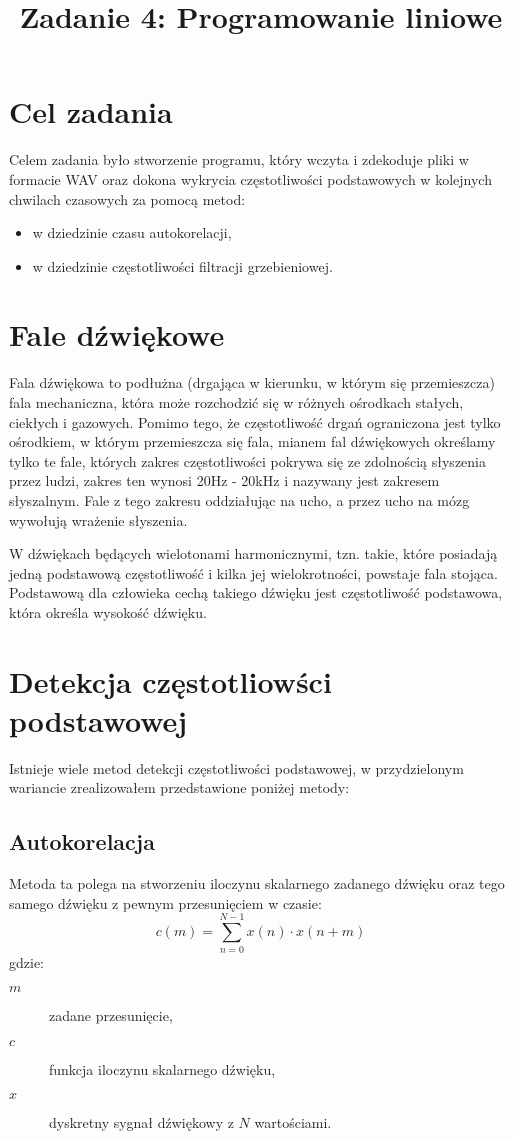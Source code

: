 \documentclass{classrep}
\author{%
  \studentinfo{Michał Janiszewski}{169485}
}
\title{Zadanie 4: Programowanie liniowe}
\begin{document}
\maketitle

\section{Cel zadania}
Celem zadania było stworzenie programu, który wczyta i zdekoduje pliki w formacie WAV oraz dokona wykrycia częstotliwości podstawowych w kolejnych chwilach czasowych za pomocą metod:
\begin{itemize}
 \item w dziedzinie czasu \ppauza autokorelacji,
 \item w dziedzinie częstotliwości \ppauza filtracji grzebieniowej.
\end{itemize}

\section{Fale dźwiękowe}
Fala dźwiękowa to podłużna (drgająca w kierunku, w którym się przemieszcza) fala mechaniczna, która może rozchodzić się w różnych ośrodkach \ppauza stałych, ciekłych i gazowych. Pomimo tego, że częstotliwość drgań ograniczona jest tylko ośrodkiem, w którym przemieszcza się fala, mianem fal dźwiękowych określamy tylko te fale, których zakres częstotliwości pokrywa się ze zdolnością słyszenia przez ludzi, zakres ten wynosi 20Hz - 20kHz i nazywany jest zakresem słyszalnym. Fale z tego zakresu oddziałując na ucho, a przez ucho na mózg wywołują wrażenie słyszenia.

W dźwiękach będących wielotonami harmonicznymi, tzn. takie, które posiadają jedną podstawową częstotliwość i kilka jej wielokrotności, powstaje fala stojąca. Podstawową dla człowieka cechą takiego dźwięku jest częstotliwość podstawowa, która określa wysokość dźwięku.

\section{Detekcja częstotliowści podstawowej}
Istnieje wiele metod detekcji częstotliwości podstawowej, w przydzielonym wariancie zrealizowałem przedstawione poniżej metody:
\subsection{Autokorelacja}
\label{sec.autocorrelation}
Metoda ta polega na stworzeniu iloczynu skalarnego zadanego dźwięku oraz tego samego dźwięku z pewnym przesunięciem w czasie:
\begin{equation}
 c(m) = \displaystyle \sum^{N - 1}_{n = 0} x(n) \cdot x(n + m)
\end{equation}
gdzie:
\begin{description}
 \item[$m$] zadane przesunięcie,
 \item[$c$] funkcja iloczynu skalarnego dźwięku,
 \item[$x$] dyskretny sygnał dźwiękowy z $N$ wartościami.
\end{description}
\end{document}

